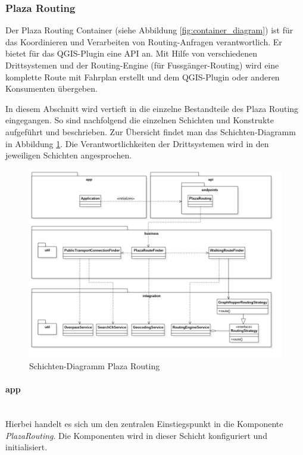 \subsubsection{Plaza Routing}
\label{architektur:Plaza Routing}
Der Plaza Routing Container (siehe Abbildung \ref{fig:container_diagram}) ist für das Koordinieren und Verarbeiten von Routing-Anfragen verantwortlich. Er bietet für das QGIS-Plugin eine API an. Mit Hilfe von verschiedenen Drittsystemen und der Routing-Engine (für Fussgänger-Routing) wird eine komplette Route mit Fahrplan erstellt und dem QGIS-Plugin oder anderen Konsumenten übergeben.

In diesem Abschnitt wird vertieft in die einzelne Bestandteile des Plaza Routing eingegangen. So sind nachfolgend die einzelnen Schichten und Konstrukte aufgeführt und beschrieben. Zur Übersicht findet man das Schichten-Diagramm in Abbildung \ref{fig:package_diagram_plaza_routing}. Die Verantwortlichkeiten der Drittsystemen wird in den jeweiligen Schichten angesprochen.

\begin{figure}[ht]
\centering
\includegraphics[width=1\linewidth]{projectdoc/img/package_diagram}
\caption[Schichten-Diagramm Plaza Routing]{Schichten-Diagramm Plaza Routing}
\label{fig:package_diagram_plaza_routing}
\end{figure}

\paragraph{app}\label{architektur:app-layer}~\\
Hierbei handelt es sich um den zentralen Einstiegspunkt in die Komponente \emph{PlazaRouting}. Die Komponenten wird in dieser Schicht konfiguriert und initialisiert.


